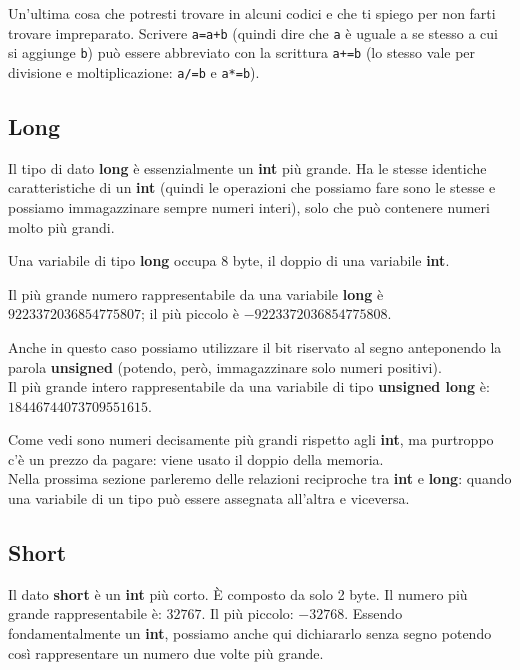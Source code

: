 	Un'ultima cosa che potresti trovare in alcuni codici e che ti spiego per non farti trovare impreparato. Scrivere \verb|a=a+b| (quindi dire che \verb|a| è uguale a se stesso a cui si aggiunge \verb|b|) può essere abbreviato con la scrittura \verb|a+=b| (lo stesso vale per divisione e moltiplicazione: \verb|a/=b| e \verb|a*=b|).
	
	
		
	\subsection{Long}
	
	Il tipo di dato \textbf{long} è essenzialmente un \textbf{int} più grande. Ha le stesse identiche caratteristiche di un \textbf{int} (quindi le operazioni che possiamo fare sono le stesse e possiamo immagazzinare sempre numeri interi), solo che può contenere numeri molto più grandi. 
	
	Una variabile di tipo \textbf{long} occupa $8$ byte, il doppio di una variabile \textbf{int}. 
	
	Il più grande numero rappresentabile da una variabile \textbf{long} è $9223372036854775807$; il più piccolo è $-9223372036854775808$.
	
	Anche in questo caso possiamo utilizzare il bit riservato al segno anteponendo la parola \textbf{unsigned} (potendo, però, immagazzinare solo numeri positivi).
	\\Il più grande intero rappresentabile da una variabile di tipo \textbf{unsigned long} è: \\$18446744073709551615$.
	
	Come vedi sono numeri decisamente più grandi rispetto agli \textbf{int}, ma purtroppo c'è un prezzo da pagare: viene usato il doppio della memoria.
	\\
	
	Nella prossima sezione parleremo delle relazioni reciproche tra \textbf{int} e \textbf{long}: quando una variabile di un tipo può essere assegnata all'altra e viceversa.
	
	\subsection{Short}
	Il dato \textbf{short} è un \textbf{int} più corto. \`E composto da solo 2 byte. Il numero più grande rappresentabile è: $32767$. Il più piccolo: $-32768$. Essendo fondamentalmente un  \textbf{int}, possiamo anche qui dichiararlo senza segno potendo così rappresentare un numero due volte più grande.
	
